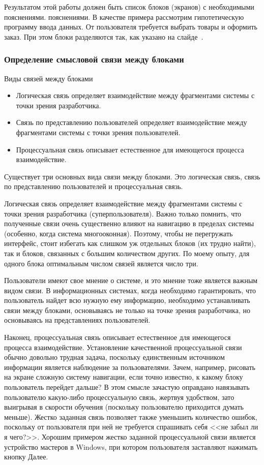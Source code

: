 \documentclass{../industrial-development}
\begin{document}
Результатом этой работы должен быть список блоков (экранов) с необходимыми пояснениями. пояснениями. В качестве примера рассмотрим гипотетическую программу ввода данных. От пользователя требуется выбрать товары и оформить заказ. При этом блоки разделяются так, как указано на слайде~\cite[с.~117--118]{Golovach}.

\begin{frame} \frametitle{Определение смысловой связи между блоками}

 \begin{block}{Виды связей между блоками}
  \begin{itemize}
   \item Логическая связь определяет взаимодействие между фрагментами системы с точки зрения разработчика.
   \item Связь по представлению пользователей определяет взаимодействие между фрагментами системы с точки зрения пользователей.
   \item Процессуальная связь описывает естественное для имеющегося процесса взаимодействие.
  \end{itemize}
 \end{block}
\end{frame}

\lecturenotes

Существует три основных вида связи между блоками. Это логическая связь, связь по представлению пользователей и процессуальная связь.

Логическая связь определяет взаимодействие между фрагментами системы с точки зрения разработчика (суперпользователя). Важно только помнить, что полученные связи очень существенно влияют на навигацию в пределах системы (особенно, когда система многооконная). Поэтому, чтобы не перегружать интерфейс, стоит избегать как слишком уж отдельных блоков (их трудно найти), так и блоков, связанных с большим количеством других. По моему опыту, для одного блока оптимальным числом связей является число три.

Пользователи имеют свое мнение о системе, и это мнение тоже является важным видом связи. В информационных системах, когда необходимо гарантировать, что пользователь найдет всю нужную ему информацию, необходимо устанавливать связи между блоками, основываясь не только на точке зрения разработчика, но основываясь на представлениях пользователей. 

Наконец, процессуальная связь описывает естественное для имеющегося процесса взаимодействие. Установление качественной процессуальной связи обычно довольно трудная задача, поскольку единственным источником информации является наблюдение за пользователями. Зачем, например, рисовать на экране сложную систему навигации, если точно известно, к какому блоку пользователь перейдет дальше? В этом смысле зачастую оправдано навязывать пользователю какую-либо процессуальную связь, жертвуя удобством, зато выигрывая в скорости обучения (поскольку пользователю приходится думать меньше). Жестко заданная связь позволяет также уменьшить количество ошибок, поскольку от пользователя при ней не требуется спрашивать себя <<не забыл ли я чего?>>. Хорошим примером жестко заданной процессуальной связи является устройство мастеров в Windows, при котором пользователя заставляют нажимать кнопку Далее.
\end{document}
